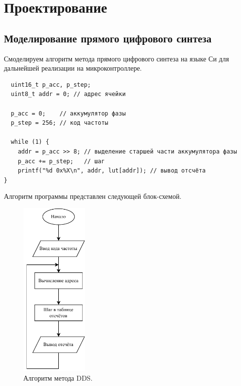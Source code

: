 \chapter{Проектирование}

\section{Моделирование прямого цифрового синтеза}
Смоделируем алгоритм метода прямого цифрового синтеза на языке Си для дальнейшей реализации на микроконтроллере.

\begin{code}
\begin{verbatim}
  uint16_t p_acc, p_step;
  uint8_t addr = 0; // адрес ячейки

  p_acc = 0;    // аккумулятор фазы
  p_step = 256; // код частоты

  while (1) {
    addr = p_acc >> 8; // выделение старшей части аккумулятора фазы
    p_acc += p_step;   // шаг
    printf("%d 0x%X\n", addr, lut[addr]); // вывод отсчёта
}
\end{verbatim}
\end{code}

	Алгоритм программы представлен следующей блок-схемой.
	
\begin{figure}[H]
    \centering
    \includegraphics[width=0.3\textwidth]{../image/dds_block.pdf}
    \caption{Алгоритм метода DDS.}
\end{figure}
	
